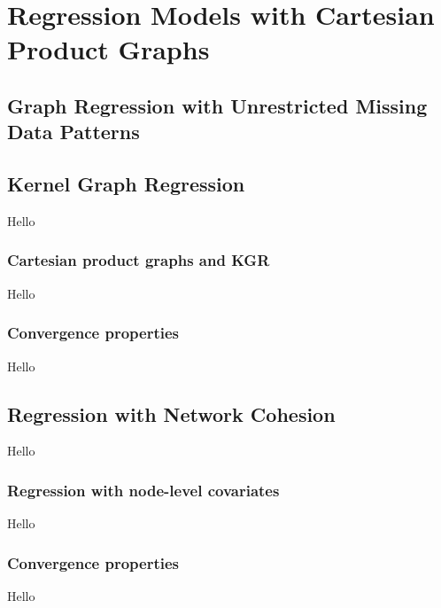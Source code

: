 \chapter{Regression Models with Cartesian Product Graphs}


\label{chap:kgr_rnc_2d}

\section{Graph Regression with Unrestricted Missing Data Patterns}

\section{Kernel Graph Regression}

\label{sec:kgr_mdp}

Hello

\subsection{Cartesian product graphs and KGR}

Hello

\subsection{Convergence properties}

Hello


\section{Regression with Network Cohesion}

\label{sec:rnc_mdp}

Hello

\subsection{Regression with node-level covariates}

Hello

\subsection{Convergence properties}

Hello